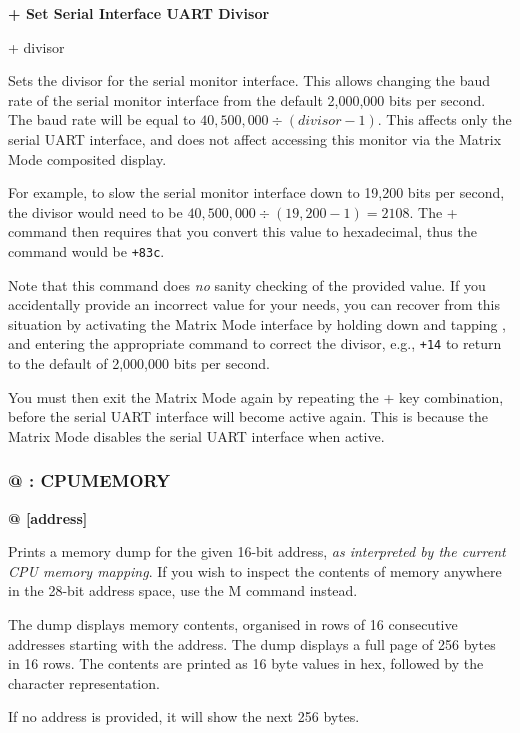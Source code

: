 \begin{description}[leftmargin=2cm,style=nextline]
\item [Format:] {\bf + Set Serial Interface UART Divisor}
\item [Usage:] + divisor

\item [Remarks:] Sets the divisor for the serial monitor interface.
  This allows changing the baud rate of the serial monitor interface
  from the default 2,000,000 bits per second.  The baud rate will be
  equal to $40,500,000 \div (divisor-1)$. This affects only the
  serial UART interface, and does not affect accessing this monitor
  via the Matrix Mode composited display.

  For example, to slow the
  serial monitor interface down to 19,200 bits per second, the divisor
  would need to be $40,500,000 \div (19,200 - 1) = 2108$.
  The + command then requires that you convert this value to hexadecimal,
  thus the command would be {\tt +83c}.

  Note that this command does {\em no} sanity checking of the provided value.
  If you accidentally provide an incorrect value for your needs, you can
  recover from this situation by activating the Matrix Mode interface by holding
  down \megasymbolkey and tapping , and entering
  the appropriate command to correct the divisor, e.g., {\tt +14} to return
  to the default of 2,000,000 bits per second.

  You must then exit the Matrix
  Mode again by repeating the \megasymbolkey +  key combination,
  before the serial UART interface will become active again. This is because
  the Matrix Mode disables the serial UART interface when active.
\end{description}

\subsubsection{@ : CPUMEMORY}
\begin{description}[leftmargin=2cm,style=nextline]
\item [Format:] {\bf @ [address]}
\item [Usage:] Prints a memory dump for the given 16-bit address,
  {\em as interpreted by the current CPU memory mapping}.
  If you wish to inspect the contents of memory anywhere in the 28-bit
  address space, use the M command instead.

  The dump displays memory contents, organised in rows
  of 16 consecutive addresses starting with the
  address. The dump displays
  a full page of 256 bytes in 16 rows.
  The contents are printed as 16 byte values in hex,
  followed by the character representation.

\item [Remarks:] If no address is provided, it will show the next 256 bytes.

\end{description}

